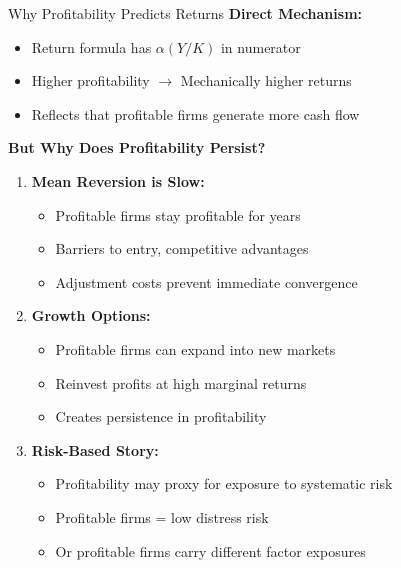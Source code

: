 \documentclass{beamer}
\begin{document}
\begin{frame}{Why Profitability Predicts Returns}
    \textbf{Direct Mechanism:}
    \begin{itemize}
        \item Return formula has $\alpha (Y/K)$ in numerator
        \item Higher profitability $\rightarrow$ Mechanically higher returns
        \item Reflects that profitable firms generate more cash flow
    \end{itemize}
    
    
    \textbf{But Why Does Profitability Persist?}
    \begin{enumerate}
        \item \textbf{Mean Reversion is Slow:}
        \begin{itemize}
            \item Profitable firms stay profitable for years
            \item Barriers to entry, competitive advantages
            \item Adjustment costs prevent immediate convergence
        \end{itemize}
        
        \item \textbf{Growth Options:}
        \begin{itemize}
            \item Profitable firms can expand into new markets
            \item Reinvest profits at high marginal returns
            \item Creates persistence in profitability
        \end{itemize}
        
        \item \textbf{Risk-Based Story:}
        \begin{itemize}
            \item Profitability may proxy for exposure to systematic risk
            \item Profitable firms = low distress risk
            \item Or profitable firms carry different factor exposures
        \end{itemize}
    \end{enumerate}
\end{frame}
\end{document}
